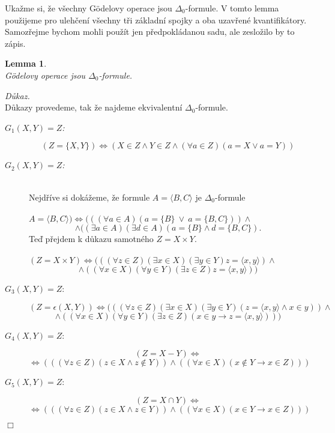 \documentclass[12pt,a4paper]{article}
\newtheorem{lemma}[veta]{Lemma}
\newenvironment{proof}
{\noindent \textit{D\r{u}kaz.}}
{\hspace*{\fill} $\Box$}
\begin{document}
Uka\v{z}me si, \v{z}e v\v{s}echny G\"{o}delovy operace jsou $\Delta_0$-formule. V tomto lemma pou\v{z}ijeme pro uleh\v{c}en\'{i} v\v{s}echny t\v{r}i z\'{a}kladn\'{i} spojky a oba uzav\v{r}en\'{e} kvantifik\'{a}tory. Samoz\v{r}ejme bychom mohli pou\v{z}\'{i}t jen p\v{r}edpokl\'{a}danou sadu, ale zeslo\v{z}ilo by to z\'{a}pis. 
\begin{lemma}
~\\
\label{lem:in}
G\"{o}delovy operace jsou $\Delta_0$-formule.
\end{lemma}
\begin{proof}
~\\D\r{u}kazy provedeme, tak \v{z}e najdeme ekvivalentn\'{i} $\Delta_0$-formule.
\begin{description}

\item[\textit{$G_1(X,Y)=Z$:}] 
\[ ( Z=\{X,Y\}) \Leftrightarrow ( X \in Z \wedge  Y \in Z \wedge (\forall a \in Z)(a=X \vee a=Y))   \]
\item[\textit{ $G_2(X,Y)=Z$:}]
~\\
Nejd\v{r}\'{i}ve si dok\'{a}\v{z}eme, \v{z}e formule $  A= \langle B,C  \rangle $ je  $\Delta_0$-formule \\
~\\
$ A= \langle B,C  \rangle )\Leftrightarrow (((\forall a \in A)(a = \{B\} ~ \vee ~ a = \{B,C\})) \wedge $  
\[  \wedge ((\exists a \in A)(\exists d \in A)(a=\{B\} \wedge d=\{B,C\}) . \] 
Te\v{d} p\v{r}ejdem k d\r{u}kazu samotn\'{e}ho $ Z=X \times  Y $. \\
~\\
$ (Z=X \times  Y) \Leftrightarrow ( ((\forall z \in Z) (\exists x \in X)  (\exists y \in Y)  z= \langle  x,y \rangle ) \wedge $ 
\[  \wedge ((\forall x \in X) (\forall y \in Y)  (\exists z \in Z) z= \langle x,y \rangle ) )  \]
\item[$ G_3(X,Y)= Z $:]
\[   (Z=\epsilon(X,Y)) \Leftrightarrow (((\forall z \in Z) (\exists x \in X)  (\exists y \in Y) ( z= \langle x,y \rangle \wedge x \in y)) \wedge \] 
\[  \wedge ((\forall x \in X) (\forall y \in Y) (\exists z \in Z) ( x \in y \rightarrow  z= \langle  x,y \rangle)))  \]
\item[$ G_4(X,Y)= Z $:] 
\[ (Z=X -Y ) \Leftrightarrow  \]\[\Leftrightarrow (((\forall z \in Z) (z \in X \wedge z \notin Y)) \wedge ((\forall x \in X) (x \notin Y \rightarrow x \in Z)))  \]
\item[$ G_5(X,Y)= Z $:]
 \[  (Z=X \cap Y ) \Leftrightarrow \]\[\Leftrightarrow(((\forall z \in Z) (z \in X \wedge z \in Y)) \wedge ((\forall x \in X) (x \in Y \rightarrow x \in Z))) \]  

\end{description}
\end{proof}
\end{document}
